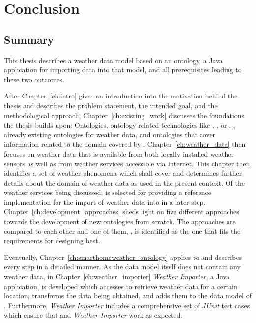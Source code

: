 \chapter{Conclusion}
\label{ch:conclusion}

\section{Summary}

This thesis describes a weather data model based on an  ontology, a Java application for importing data into that model, and all prerequisites leading to these two outcomes.

After Chapter~\ref{ch:intro} gives an introduction into the motivation behind the thesis and describes the problem statement, the intended goal, and the methodological approach, Chapter~\ref{ch:existing_work} discusses the foundations the thesis builds upon: Ontologies, ontology related technologies like , , or , \thinkhome, already existing ontologies for weather data, and ontologies that cover information related to the domain covered by \smarthomeweather. Chapter~\ref{ch:weather_data} then focuses on weather data that is available from both locally installed weather sensors as well as from weather services accessible via Internet. This chapter then identifies a set of weather phenomena which \smarthomeweather shall cover and determines further details about the domain of weather data as used in the present context.
Of the weather services being discussed, \yrno is selected for providing a reference implementation for the import of weather data into \smarthomeweather in a later step. Chapter~\ref{ch:development_approaches} sheds light on five different approaches towards the development of new ontologies from scratch. The approaches are compared to each other and one of them, \methontology, is identified as the one that fits the requirements for designing \smarthomeweather best.

Eventually, Chapter~\ref{ch:smarthomeweather_ontology} applies \methontology to \smarthomeweather and describes every step in a detailed manner. As the data model itself does not contain any weather data, in Chapter~\ref{ch:weather_importer} \emph{Weather Importer}, a Java application, is developed which accesses \yrno to retrieve weather data for a certain location, transforms the data being obtained, and adds them to the data model of \smarthomeweather. Furthermore, \emph{Weather Importer} includes a comprehensive set of \emph{JUnit} test cases which ensure that \smarthomeweather and \emph{Weather Importer} work as expected.

